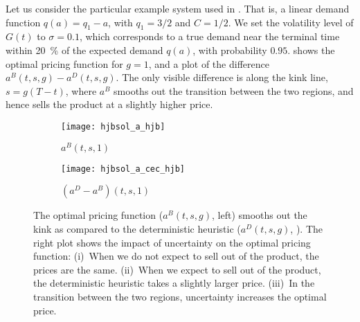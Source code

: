 \documentclass[main.tex]{subfiles}
\begin{document}
\begin{example}\label{ex:function_impact_uncertainty}
  Let us consider the particular example system used in
  . %
  That is, a linear demand function $q(a)=q_1-a$, with $q_1=3/2$
  and $C=1/2$.
  We set the volatility level of $G(t)$ to $\sigma=0.1$, which
  corresponds to a true demand near the terminal time within \SI{20}{\percent} of the
  expected demand $q(a)$, with probability $0.95$.
   shows the
  optimal pricing function for $g=1$, and a plot of the difference
  $a^B(t,s,g)-a^D(t,s,g)$. The only visible difference is along the kink
  line, $s=g(T-t)$, where $a^B$ smooths out the transition between
  the two regions, and hence sells the product at a slightly higher
  price.
  \begin{figure}[htb]
    \centering
    \begin{subfigure}[b]{0.5\textwidth}
      \texttt{[image: hjbsol\_a\_hjb]}
      \caption{$a^B(t,s,1)$}
    \end{subfigure}%
    \begin{subfigure}[b]{0.5\textwidth}
      \texttt{[image: hjbsol\_a\_cec\_hjb]}
      \caption{$(a^D-a^B)(t,s,1)$}
    \end{subfigure}%
    \caption{The optimal pricing function ($a^B(t,s,g)$, left) smooths out the
      kink as compared to the deterministic heuristic ($a^D(t,s,g)$,
      ).
      The right plot shows the impact of uncertainty on the optimal
      pricing function: (i)~When we do not expect to sell out of the
      product, the prices are the same. (ii)~When we expect to sell out
      of the product, the deterministic heuristic takes a slightly larger
      price.
      (iii)~In the transition between the two regions, uncertainty
      increases the optimal price.
    }\label{fig:hjbsol_a}
  \end{figure}
\end{example}
\end{document}
